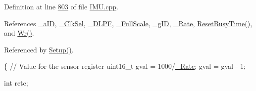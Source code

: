 Definition at line \hyperlink{_i_m_u_8cpp_source_l00803}{803} of file \hyperlink{_i_m_u_8cpp_source}{IMU.cpp}.



References \hyperlink{_i_m_u_8h_source_l00094}{\_\-aID}, \hyperlink{_i_m_u_8h_source_l00097}{\_\-ClkSel}, \hyperlink{_i_m_u_8h_source_l00095}{\_\-DLPF}, \hyperlink{_i_m_u_8h_source_l00096}{\_\-FullScale}, \hyperlink{_i_m_u_8h_source_l00093}{\_\-gID}, \hyperlink{_i_m_u_8h_source_l00098}{\_\-Rate}, \hyperlink{_i_m_u_8h_source_l00190}{ResetBusyTime()}, and \hyperlink{_i_m_u_8cpp_source_l00758}{Wr()}.



Referenced by \hyperlink{_i_m_u_8cpp_source_l00194}{Setup()}.


\begin{DoxyCode}
\{
    \textcolor{comment}{// Value for the sensor register}
    uint16\_t gval = 1000/\hyperlink{class_i_m_u_aafe9be107385c7ccedeb1539cf6d7fce}{_Rate};
    gval = gval - 1;

    \textcolor{keywordtype}{int} retc;
    

\end{DoxyCode}
